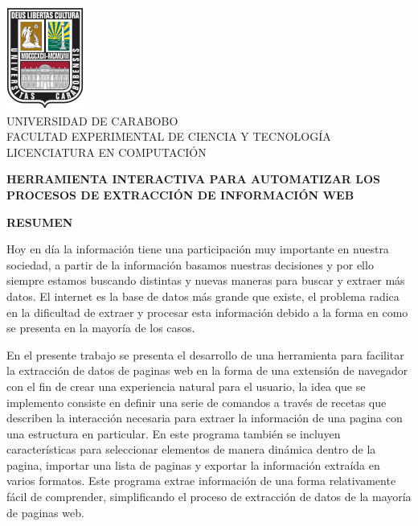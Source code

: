 \documentclass[12pt]{report}
\begin{document}
\begin{center}

\includegraphics[width=1in]{assets/UC_logo.png} \\
UNIVERSIDAD DE CARABOBO \\
FACULTAD EXPERIMENTAL DE CIENCIA Y TECNOLOGÍA \\
LICENCIATURA EN COMPUTACIÓN \\

\vspace{2em}

\textbf{HERRAMIENTA INTERACTIVA PARA AUTOMATIZAR LOS PROCESOS DE EXTRACCIÓN DE INFORMACIÓN WEB}

\vspace{1em}

\textbf{RESUMEN}
{}

\vspace{-1em}

\end{center}

\begin{spacing}{1.5}
Hoy en día la información tiene una participación muy importante en nuestra sociedad, a partir de la información basamos nuestras decisiones y por ello siempre estamos buscando distintas y nuevas maneras para buscar y extraer más datos. El internet es la base de datos más grande que existe, el problema radica en la dificultad de extraer y procesar esta información debido a la forma en como se presenta en la mayoría de los casos.

En el presente trabajo se presenta el desarrollo de una herramienta para facilitar la extracción de datos de paginas web en la forma de una extensión de navegador con el fin de crear una experiencia natural para el usuario, la idea que se implemento consiste en definir una serie de comandos a través de recetas que describen la interacción necesaria para extraer la información de una pagina con una estructura en particular. En este programa también se incluyen características para seleccionar elementos de manera dinámica dentro de la pagina, importar una lista de paginas y exportar la información extraída en varios formatos. Este programa extrae información de una forma relativamente fácil de comprender, simplificando el proceso de extracción de datos de la mayoría de paginas web.
\end{spacing}
\end{document}
